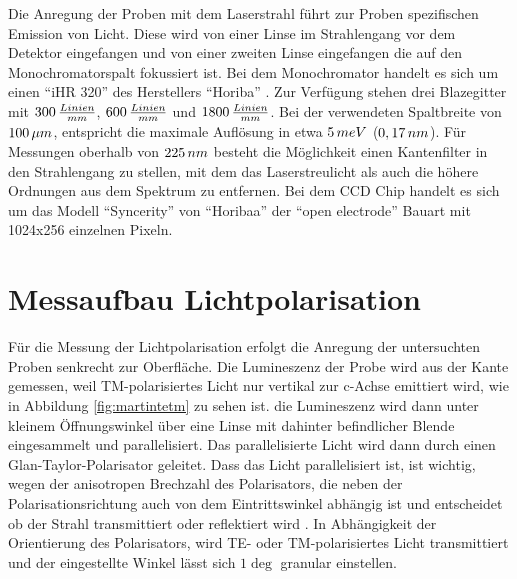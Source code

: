 Die Anregung der Proben mit dem Laserstrahl führt zur Proben spezifischen Emission von Licht. Diese wird von einer Linse im Strahlengang vor dem Detektor eingefangen und von einer zweiten Linse eingefangen die auf den Monochromatorspalt fokussiert ist.
Bei dem Monochromator handelt es sich um einen "`iHR 320"' des Herstellers "`Horiba"' . Zur Verfügung stehen drei Blazegitter mit $300 \thinspace \frac{Linien}{mm}$,
$600 \thinspace \frac{Linien}{mm}$ und $1800 \thinspace \frac{Linien}{mm}$. Bei der verwendeten Spaltbreite von $100 \thinspace \mu m$, entspricht die maximale Auflösung in etwa $5 \thinspace meV$ ($0,17 \thinspace nm$). Für Messungen oberhalb von $225 \thinspace nm$ besteht die Möglichkeit einen Kantenfilter in den Strahlengang zu stellen, mit dem das Laserstreulicht als auch die höhere Ordnungen aus dem Spektrum zu entfernen. Bei dem CCD Chip handelt es sich um das Modell "`Syncerity"' von "`Horibaa"' der "`open electrode"' Bauart mit 1024x256 einzelnen Pixeln. 

\section{Messaufbau Lichtpolarisation}

Für die Messung der Lichtpolarisation erfolgt die Anregung der untersuchten Proben senkrecht zur Oberfläche. Die Lumineszenz der Probe wird aus der Kante gemessen, weil TM-polarisiertes Licht nur vertikal zur c-Achse emittiert wird, wie in Abbildung \ref{fig:martintetm} zu sehen ist. die Lumineszenz wird dann unter kleinem Öffnungswinkel über eine Linse mit dahinter befindlicher Blende eingesammelt und parallelisiert. Das parallelisierte Licht wird dann durch einen Glan-Taylor-Polarisator geleitet. Dass das Licht parallelisiert ist, ist wichtig, wegen der anisotropen Brechzahl des Polarisators, die neben der Polarisationsrichtung auch von dem Eintrittswinkel abhängig ist und entscheidet ob der Strahl transmittiert oder reflektiert wird \cite{0950-7671-25-12-304}. In Abhängigkeit der Orientierung des Polarisators, wird TE- oder TM-polarisiertes Licht transmittiert und der eingestellte Winkel lässt sich $1\deg$ granular einstellen. 
